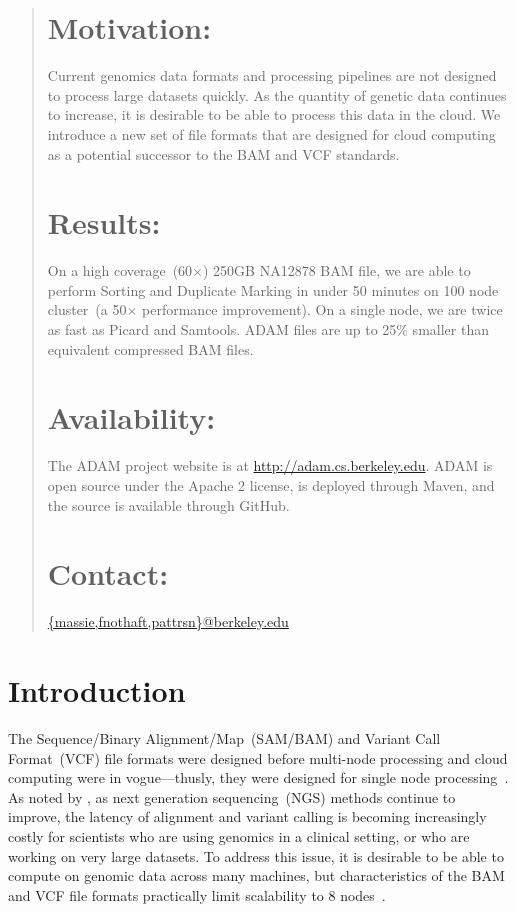 \documentclass{bioinfo}
\begin{document}
\begin{abstract}

\section{Motivation:}
Current genomics data formats and processing pipelines are not designed to process large datasets quickly. As the quantity of genetic
data continues to increase, it is desirable to be able to process this data in the cloud. We introduce a new set of file formats that are
designed for cloud computing as a potential successor to the BAM and VCF standards.

\section{Results:} On a high coverage~(60$\times$) 250GB NA12878 BAM file, we are able to perform Sorting and Duplicate Marking in under
50 minutes on 100 node cluster~(a 50$\times$ performance improvement). On a single node, we are twice as fast as Picard and Samtools. ADAM files are up to 25\%
smaller than equivalent compressed BAM files.

\section{Availability:}
The ADAM project website is at \url{http://adam.cs.berkeley.edu}. ADAM is open source under the Apache 2 license, is deployed through Maven,
and the source is available through GitHub.

\section{Contact:} \href{massie@berkeley.edu}{\{massie,fnothaft,pattrsn\}@berkeley.edu}
\end{abstract}

\section{Introduction}
\label{sec:introduction}

The Sequence/Binary Alignment/Map~(SAM/BAM) and Variant Call Format~(VCF) file formats were designed before multi-node processing
and cloud computing were in vogue---thusly, they were designed for single node processing~\citep{li09}. As noted by \citet{mcpherson09}, as
next generation sequencing~(NGS) methods continue to improve, the latency of alignment and variant calling is becoming increasingly costly
for scientists who are using genomics in a clinical setting, or who are working on very large datasets. To address this issue, it is desirable to be
able to compute on genomic data across many machines, but characteristics of the BAM and VCF file formats practically limit scalability to 8
nodes~\citep{niemenmaa12}.
\end{document}
